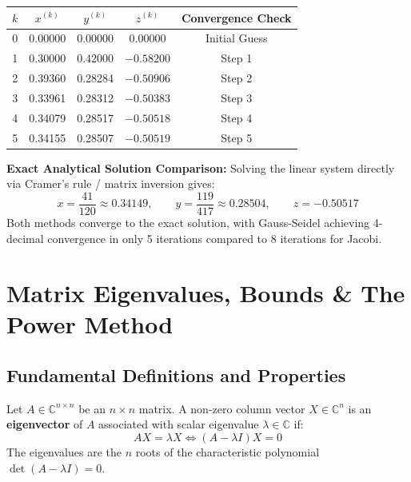 \documentclass[11pt,a4paper]{article}
\begin{document}
\begin{solbox}
\begin{center}
\begin{tabular}{ccccc}
    \toprule
    $k$ & $x^{(k)}$ & $y^{(k)}$ & $z^{(k)}$ & Convergence Check \\
    \midrule
    0 & 0.00000 & 0.00000 & 0.00000 & Initial Guess \\
    1 & 0.30000 & 0.42000 & $-0.58200$ & Step 1 \\
    2 & 0.39360 & 0.28284 & $-0.50906$ & Step 2 \\
    3 & 0.33961 & 0.28312 & $-0.50383$ & Step 3 \\
    4 & 0.34079 & 0.28517 & $-0.50518$ & Step 4 \\
    5 & 0.34155 & 0.28507 & $-0.50519$ & Step 5 \\
    \bottomrule
\end{tabular}
\end{center}

\textbf{Exact Analytical Solution Comparison:}
Solving the linear system directly via Cramer's rule / matrix inversion gives:
$$x = \frac{41}{120} \approx \mathbf{0.34149}, \qquad y = \frac{119}{417} \approx \mathbf{0.28504}, \qquad z = \mathbf{-0.50517}$$
Both methods converge to the exact solution, with Gauss-Seidel achieving 4-decimal convergence in only 5 iterations compared to 8 iterations for Jacobi.
\end{solbox}

\newpage

\section{Matrix Eigenvalues, Bounds \& The Power Method}

\subsection{Fundamental Definitions and Properties}
Let $A \in \mathbb{C}^{n \times n}$ be an $n \times n$ matrix. A non-zero column vector $X \in \mathbb{C}^n$ is an \textbf{eigenvector} of $A$ associated with scalar eigenvalue $\lambda \in \mathbb{C}$ if:
\begin{equation}
    A X = \lambda X \iff (A - \lambda I) X = 0
\end{equation}
The eigenvalues are the $n$ roots of the characteristic polynomial $\det(A - \lambda I) = 0$.
\end{document}

